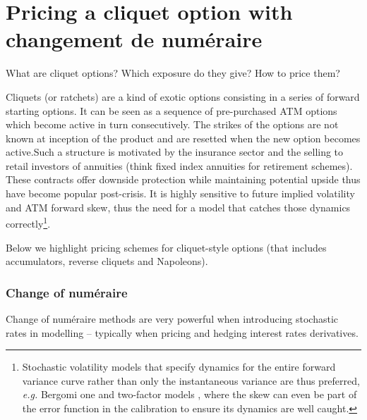 \section{Pricing a cliquet option with changement de num\'eraire}

\begin{tcolorbox}[width=\linewidth, sharp corners=all, colback=white!95!black]
What are cliquet options? Which exposure do they give? How to price them?
\end{tcolorbox}

Cliquets (or ratchets) are a kind of exotic options consisting in a series of forward starting options. It can be seen as a sequence of pre-purchased ATM options which become active in turn consecutively. The strikes of the options are not known at inception of the product and are resetted when the new option becomes active.\newline Such a structure is motivated by the insurance sector and the selling to retail investors of annuities (think fixed index annuities for retirement schemes). These contracts offer downside protection while maintaining potential upside thus have become popular post-crisis. \newline It is highly sensitive to future implied volatility and ATM forward skew, thus the need for a model that catches those dynamics correctly\footnote{Stochastic volatility models that specify dynamics for the entire forward variance curve rather than only the instantaneous variance are thus preferred, \textit{e.g.} Bergomi one and two-factor models \cite{bergomi2004smile, bergomi2005smile}, where the skew can even be part of the error function in the calibration to ensure its dynamics are well caught.}.

Below we highlight pricing schemes for cliquet-style options (that includes accumulators, reverse cliquets and Napoleons).

\subsubsection*{Change of num\'eraire}

Change of num\'eraire methods are very powerful when introducing stochastic rates in modelling -- typically when pricing and hedging interest rates derivatives. 